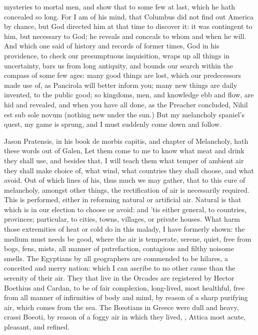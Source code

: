 {mysteries to mortal men, and show that to some few at last, which he
hath concealed so long. For I am of his mind, that Columbus did
not find out America by chance, but God directed him at that time to
discover it: it was contingent to him, but necessary to God; he reveals
and conceals to whom and when he will. And which one said of
history and records of former times, God in his providence, to check
our presumptuous inquisition, wraps up all things in uncertainty, bars
us from long antiquity, and bounds our search within the compass of
some few ages: many good things are lost, which our predecessors made
use of, as Pancirola will better inform you; many new things are daily
invented, to the public good; so kingdoms, men, and knowledge ebb and
flow, are hid and revealed, and when you have all done, as the Preacher
concluded, Nihil est sub sole novum (nothing new under the sun.) But my
melancholy spaniel's quest, my game is sprung, and I must suddenly come
down and follow.

Jason Pratensis, in his book \textlatin{de morbis capitis}, and chapter of
Melancholy, hath these words out of Galen, Let them come to me to
know what meat and drink they shall use, and besides that, I will teach
them what temper of ambient air they shall make choice of, what wind,
what countries they shall choose, and what avoid. Out of which lines of
his, thus much we may gather, that to this cure of melancholy, amongst
other things, the rectification of air is necessarily required. This is
performed, either in reforming natural or artificial air. Natural is
that which is in our election to choose or avoid: and 'tis either
general, to countries, provinces; particular, to cities, towns,
villages, or private houses. What harm those extremities of heat or
cold do in this malady, I have formerly shown: the medium must needs be
good, where the air is temperate, serene, quiet, free from bogs, fens,
mists, all manner of putrefaction, contagious and filthy noisome
smells. The Egyptians by all geographers are commended to be
hilares, a conceited and merry nation: which I can ascribe to no other
cause than the serenity of their air. They that live in the Orcades are
registered by Hector Boethius and Cardan, to be of fair
complexion, long-lived, most healthful, free from all manner of
infirmities of body and mind, by reason of a sharp purifying air, which
comes from the sea. The B\oe{}otians in Greece were dull and heavy, crassi
Boeoti, by reason of a foggy air in which they lived, , Attica most acute, pleasant, and refined.

}
